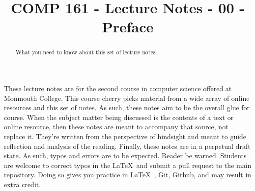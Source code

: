 \documentclass[]{tufte-handout}
\title{COMP 161 - Lecture Notes - 00 -Preface}
\begin{document}
\maketitle

\begin{abstract}
What you need to know about this set of lecture notes.
\end{abstract}

These lecture notes are for the second course in computer science offered at Monmouth College.  This course cherry picks material from a wide array of online resources and this set of notes.  As such, these notes aim to be the overall glue for course.  When the subject matter being discussed is the contents of a text or online resource, then these notes are meant to accompany that source, not replace it.  They're written from the perspective of hindsight and meant to guide reflection and analysis of the reading. 
Finally, these notes are in a perpetual draft state. As such, typos and errors are to be expected. Reader be warned. Students are welcome to correct typos in the \LaTeX\ and submit a pull request to the main repository. Doing so gives you practice in \LaTeX\ , Git, Github, and may result in extra credit.
\end{document}
